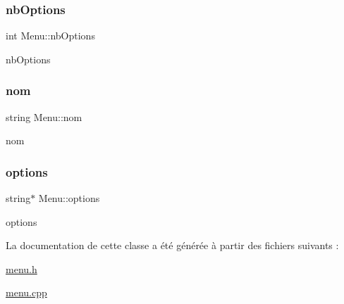 \subsubsection{\texorpdfstring{nb\+Options}{nbOptions}}
{\footnotesize\ttfamily int Menu\+::nb\+Options\hspace{0.3cm}{\ttfamily [private]}}



nb\+Options 

\mbox{\label{class_menu_a99574cb51606811f697854859bc1ccc1}} 
\subsubsection{\texorpdfstring{nom}{nom}}
{\footnotesize\ttfamily string Menu\+::nom\hspace{0.3cm}{\ttfamily [private]}}



nom 

\mbox{\label{class_menu_aec975cfea9216420d5754ce2e9321390}} 
\subsubsection{\texorpdfstring{options}{options}}
{\footnotesize\ttfamily string$\ast$ Menu\+::options\hspace{0.3cm}{\ttfamily [private]}}



options 



La documentation de cette classe a été générée à partir des fichiers suivants \+:\begin{DoxyCompactItemize}
\item 
\hyperlink{menu_8h}{menu.\+h}\item 
\hyperlink{menu_8cpp}{menu.\+cpp}\end{DoxyCompactItemize}
